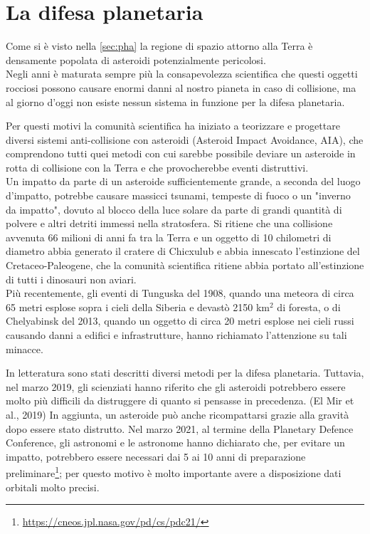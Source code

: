 \documentclass[a4paper,11pt,openright]{book}
\begin{document}
\section{La difesa planetaria}
Come si è visto nella \cref{sec:pha} la regione di spazio attorno alla Terra è densamente popolata di asteroidi potenzialmente pericolosi.\\
Negli anni è maturata sempre più la consapevolezza scientifica che questi oggetti rocciosi possono causare enormi danni al nostro pianeta in caso di collisione, ma al giorno d'oggi non esiste nessun sistema in funzione per la difesa planetaria.

Per questi motivi la comunità scientifica ha iniziato a teorizzare e progettare diversi sistemi anti-collisione con asteroidi (Asteroid Impact Avoidance, AIA), che comprendono tutti quei metodi con cui sarebbe possibile deviare un asteroide in rotta di collisione con la Terra e che provocherebbe eventi distruttivi.\\
Un impatto da parte di un asteroide sufficientemente grande, a seconda del luogo d'impatto, potrebbe causare massicci tsunami, tempeste di fuoco o un "inverno da impatto", dovuto al blocco della luce solare da parte di grandi quantità di polvere e altri detriti immessi nella stratosfera. Si ritiene che una collisione avvenuta 66 milioni di anni fa tra la Terra e un oggetto di 10 chilometri di diametro abbia generato il cratere di Chicxulub e abbia innescato l'estinzione del Cretaceo-Paleogene, che la comunità scientifica ritiene abbia portato all'estinzione di tutti i dinosauri non aviari.\\
Più recentemente, gli eventi di Tunguska del 1908, quando una meteora di circa 65 metri esplose sopra i cieli della Siberia e devastò 2150 km$^2$ di foresta, o di Chelyabinsk del 2013, quando un oggetto di circa 20 metri esplose nei cieli russi causando danni a edifici e infrastrutture, hanno richiamato l'attenzione su tali minacce.

In letteratura sono stati descritti diversi metodi per la difesa planetaria. Tuttavia, nel marzo 2019, gli scienziati hanno riferito che gli asteroidi potrebbero essere molto più difficili da distruggere di quanto si pensasse in precedenza. (El Mir et al., 2019) In aggiunta, un asteroide può anche ricompattarsi grazie alla gravità dopo essere stato distrutto. Nel marzo 2021, al termine della Planetary Defence Conference, gli astronomi e le astronome hanno dichiarato che, per evitare un impatto, potrebbero essere necessari dai 5 ai 10 anni di preparazione preliminare\footnote{\href{https://cneos.jpl.nasa.gov/pd/cs/pdc21/}{https://cneos.jpl.nasa.gov/pd/cs/pdc21/}}; per questo motivo è molto importante avere a disposizione dati orbitali molto precisi.
\end{document}
